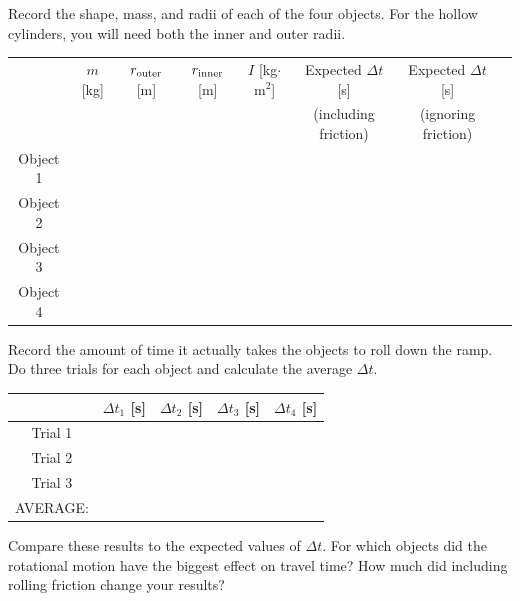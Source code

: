 \documentclass[11pt,letterpaper]{article}
\begin{document}
\vspace{1cm}

Record the shape, mass, and radii of each of the four objects. For the hollow cylinders, you will need both the inner and outer radii.

\renewcommand{\arraystretch}{1.4}
\begin{table}[h!]
\begin{tabular}{|c|c|c|c|c|c|c|c|}
\hline
& $m$ [kg] & $r_{\rm outer}$ [m] & $r_{\rm inner}$ [m] & $I$ [kg$\cdot$m$^2$] & Expected $\Delta{t}$ [s] & Expected $\Delta{t}$ [s]\\
& & & & & (including friction) & (ignoring friction)\\
\hline Object 1 & \hspace{1.5cm} & \hspace{1.5cm} & \hspace{1.5cm} & \hspace{1.5cm} & \hspace{1.5cm} & \hspace{1.5cm} \\
\hline Object 2 & & & & & & \\
\hline Object 3 & & & & & & \\
\hline Object 4 & & & & & & \\
\hline
\end{tabular}
\end{table}

Record the amount of time it actually takes the objects to roll down the ramp. Do three trials for each object and calculate the average $\Delta{t}$.
\begin{table}[h!]
\begin{tabular}{|c|c|c|c|c|}
\hline & $\Delta{t_1}$ [s] & $\Delta{t_2}$  [s] & $\Delta{t_3}$ [s] & $\Delta{t_4}$  [s] \\
\hline Trial 1 & \hspace{3cm} &\hspace{3cm} & \hspace{3cm} & \hspace{3cm} \\
\hline Trial 2 & & & & \\
\hline Trial 3 & & & & \\
\hline\hline AVERAGE: & & & & \\
\hline
\end{tabular}
\end{table}

Compare these results to the expected values of $\Delta{t}$. For which objects did the rotational motion have the biggest effect on travel time? How much did including rolling friction change your results?
\end{document}
